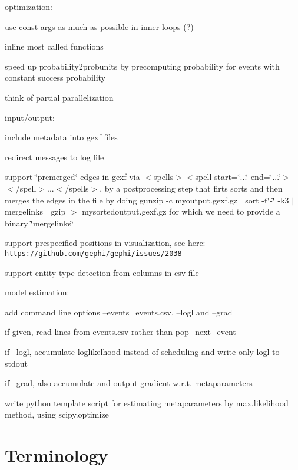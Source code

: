 optimization\+:
\begin{DoxyItemize}
\item use const args as much as possible in inner loops (?)
\item inline most called functions
\item speed up probability2probunits by precomputing probability for events with constant success probability
\item think of partial parallelization
\end{DoxyItemize}

input/output\+:
\begin{DoxyItemize}
\item include metadata into gexf files
\item redirect messages to log file
\item support \char`\"{}premerged\char`\"{} edges in gexf via $<$spells$>$$<$spell start=\char`\"{}...\char`\"{} end=\char`\"{}...\char`\"{}$>$$<$/spell$>$...$<$/spells$>$, by a postprocessing step that firts sorts and then merges the edges in the file by doing {\ttfamily gunzip -\/c myoutput.\+gexf.\+gz $\vert$ sort -\/t\char`\"{}-\/\char`\"{} -\/k3 $\vert$ mergelinks $\vert$ gzip $>$ mysortedoutput.\+gexf.\+gz} for which we need to provide a binary \char`\"{}mergelinks\char`\"{}
\item support prespecified positions in visualization, see here\+: \href{https://github.com/gephi/gephi/issues/2038}{\tt https\+://github.\+com/gephi/gephi/issues/2038}
\item support entity type detection from columns in csv file
\end{DoxyItemize}

model estimation\+:
\begin{DoxyItemize}
\item add command line options --events=events.\+csv, --logl and --grad
\item if given, read lines from events.\+csv rather than pop\+\_\+next\+\_\+event
\item if --logl, accumulate loglikelhood instead of scheduling and write only logl to stdout
\item if --grad, also accumulate and output gradient w.\+r.\+t. metaparameters
\item write python template script for estimating metaparameters by max.\+likelihood method, using scipy.\+optimize
\end{DoxyItemize}

\section*{Terminology }


